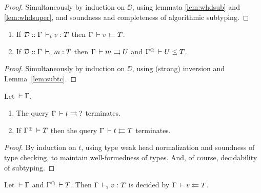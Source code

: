 \begin{proof}
  Simultaneously by induction on $\DD$, using %
  lemmata \ref{lem:whdsub} and \ref{lem:whdsuper},
  and soundness and completeness of algorithmic subtyping.
\end{proof}
\begin{theorem}
\bla
\begin{enumerate}
\item If\/ $\mathcal{D} :: \Gamma \,\vdash_\mathsf{s} v : T$ then $\Gamma \,\vdash v \leftleftarrows T$.
\item If\/ $\mathcal{D} :: \Gamma \,\vdash_\mathsf{s} m : T$ then $\Gamma \,\vdash m \rightrightarrows U$ and $\resurrect\Gamma \der U \leq T$.
\end{enumerate}
\end{theorem}
\begin{proof}
Simultaneously by induction on $\DD$, using (strong) inversion and Lemma~\ref{lem:subtc}.
\end{proof}

\begin{lemma}
  Let $\,\vdash \Gamma$.
  \begin{enumerate}
  \item The query $\Gamma \,\vdash t \rightrightarrows \mbox{?}$ terminates.
  \item If\/ $\resurrect\Gamma \der T$ then the query $\Gamma \,\vdash t \leftleftarrows T$ terminates.
  \end{enumerate}
\end{lemma}
\begin{proof}
  By induction on $t$, using type weak head normalization and soundness of type checking, to maintain well-formedness of types.
  And, of course, decidability of subtyping.
\end{proof}

\begin{theorem}
  Let $\,\vdash \Gamma$ and $\resurrect \Gamma \der T$.
  Then $\Gamma \,\vdash_\mathsf{s} v : T$ is decided by $\Gamma \,\vdash v \leftleftarrows T$.
\end{theorem}

